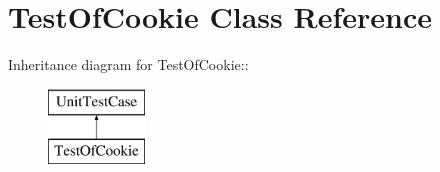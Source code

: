 \hypertarget{class_test_of_cookie}{
\section{TestOfCookie Class Reference}
\label{class_test_of_cookie}
}
Inheritance diagram for TestOfCookie::\begin{figure}[H]
\begin{center}
\leavevmode
\includegraphics[height=2cm]{class_test_of_cookie}
\end{center}
\end{figure}
